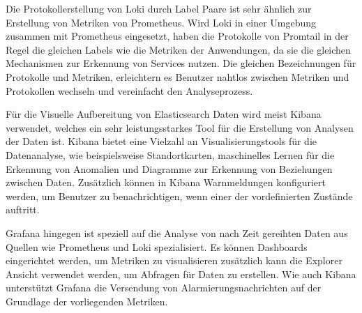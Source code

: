 Die Protokollerstellung von Loki durch Label Paare ist sehr ähnlich zur Erstellung von Metriken von Prometheus. 
Wird Loki in einer Umgebung zusammen mit Prometheus eingesetzt, haben die Protokolle von Promtail in der Regel die gleichen Labels wie die Metriken der Anwendungen, da sie die gleichen Mechanismen zur Erkennung von Services nutzen. 
Die gleichen Bezeichnungen für Protokolle und Metriken, erleichtern es Benutzer nahtlos zwischen Metriken und Protokollen wechseln und vereinfacht den Analyseprozess.
\cite{Comparis37:online}



Für die Visuelle Aufbereitung von Elasticsearch Daten wird meist Kibana verwendet, welches ein sehr leistungsstarkes Tool für die Erstellung von Analysen der Daten ist. 
Kibana bietet eine Vielzahl an Visualisierungstools für die Datenanalyse, wie beispielsweise Standortkarten, maschinelles Lernen für die Erkennung von Anomalien und Diagramme zur Erkennung von Beziehungen zwischen Daten. Zusätzlich können in Kibana Warnmeldungen konfiguriert werden, um Benutzer zu benachrichtigen, wenn einer der vordefinierten Zustände auftritt.

Grafana hingegen ist speziell auf die Analyse von nach Zeit gereihten Daten aus Quellen wie Prometheus und Loki spezialisiert.
Es können Dashboards eingerichtet werden, um Metriken zu visualisieren zusätzlich kann die Explorer Ansicht verwendet werden, um Abfragen für Daten zu erstellen. 
Wie auch Kibana unterstützt Grafana die Versendung von Alarmierungsnachrichten auf der Grundlage der vorliegenden Metriken.
\cite{Comparis37:online}